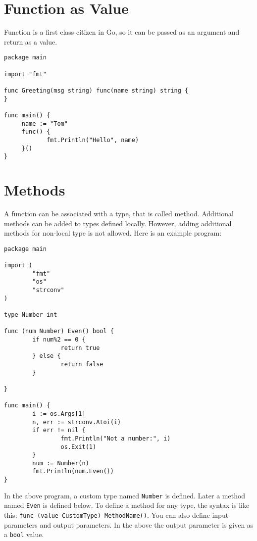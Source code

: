 \section{Function as Value}

Function is a first class citizen in Go, so it
can be passed as an argument and return as a value.

\begin{lstlisting}[caption=Function as value (funcvalue.go)]
package main

import "fmt"

func Greeting(msg string) func(name string) string {
}

func main() {
     name := "Tom"
     func() {
            fmt.Println("Hello", name)
     }()
}
\end{lstlisting}

\section{Methods}
\label{sec:methods}

A function can be associated with a type, that is called method.
Additional methods can be added to types defined locally.  However,
adding additional methods for non-local type is not allowed.  Here is
an example program:

\begin{lstlisting}[numbers=none]
package main

import (
        "fmt"
        "os"
        "strconv"
)

type Number int

func (num Number) Even() bool {
        if num%2 == 0 {
                return true
        } else {
                return false
        }

}

func main() {
        i := os.Args[1]
        n, err := strconv.Atoi(i)
        if err != nil {
                fmt.Println("Not a number:", i)
                os.Exit(1)
        }
        num := Number(n)
        fmt.Println(num.Even())
}
\end{lstlisting}

In the above program, a custom type named \texttt{Number} is
defined. Later a method named \texttt{Even} is defined below.  To
define a method for any type, the syntax is like this: \texttt{func
  (value CustomType) MethodName()}.  You can also define input
parameters and output parameters.  In the above the output parameter
is given as a \texttt{bool} value.

